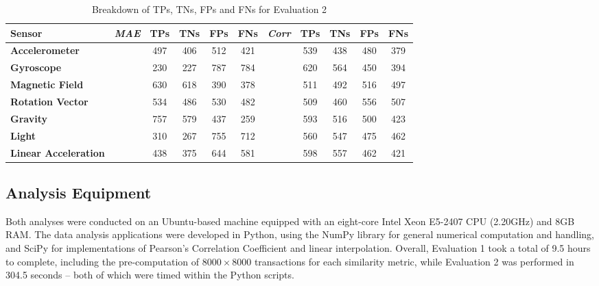 \documentclass[runningheads,a4paper]{llncs}
\begin{document}
\begin{table}[ht]
	\centering
	\caption{Breakdown of TPs, TNs, FPs and FNs for Evaluation 2}
	\label{tab:ev22}
\begin{threeparttable}
          \begin{tabular}{@{}llcccclcccc@{}}
              \toprule
              \textbf{Sensor} & \emph{MAE} & \textbf{TPs} & \textbf{TNs} & \textbf{FPs} & \textbf{FNs} & \emph{Corr} & \textbf{TPs} & \textbf{TNs} & \textbf{FPs} & \textbf{FNs}\\ \midrule
              \textbf{Accelerometer}&  & 497 & 406 & 512 & 421 & & 539 & 438 & 480 & 379 \\
              \textbf{Gyroscope} & & 230 & 227 & 787 & 784 & & 620 & 564 & 450 & 394 \\
              \textbf{Magnetic Field}& & 630 & 618 & 390 & 378 & & 511 & 492 & 516 & 497  \\
              \textbf{Rotation Vector}& & 534 & 486 & 530 & 482  & & 509 & 460 & 556 & 507  \\
              \textbf{Gravity}& & 757 & 579 & 437 & 259 & & 593 & 516 & 500 & 423 \\
              \textbf{Light}& & 310 & 267 & 755 & 712 & & 560 & 547 & 475 & 462 \\
              \textbf{Linear Acceleration}& & 438 & 375 & 644 & 581 & & 598 & 557 & 462 & 421 \\
              \bottomrule
          \end{tabular}
        \end{threeparttable}
\end{table}


\subsection{Analysis Equipment}

Both analyses were conducted on an Ubuntu-based machine equipped with an eight-core Intel Xeon E5-2407 CPU (2.20GHz) and 8GB RAM.  The data analysis applications were developed in Python, using the NumPy \cite{numpy} library for general numerical computation and handling, and SciPy \cite{scipy} for implementations of Pearson's Correlation Coefficient and linear interpolation.  Overall, Evaluation 1 took a total of 9.5 hours to complete, including the pre-computation of $8000 \times 8000$ transactions for each similarity metric, while Evaluation 2 was performed in 304.5 seconds -- both of which were timed within the Python scripts.
\end{document}

